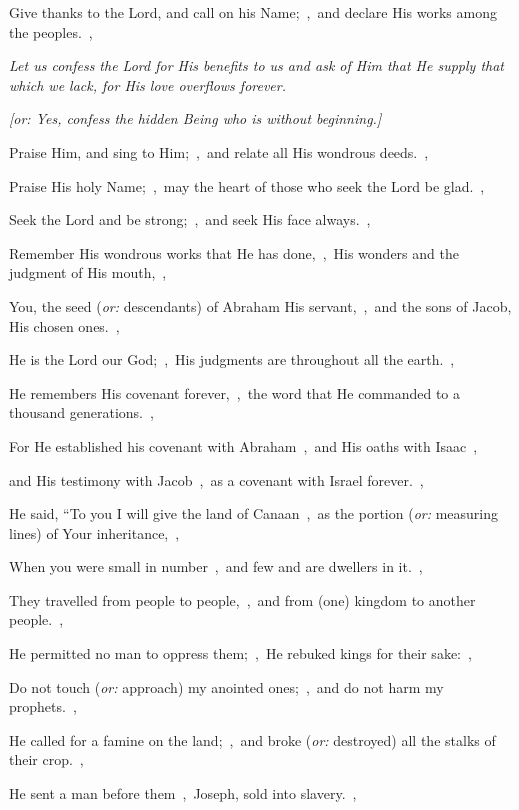 \documentclass[12pt,twoside,a5paper]{article}
\newcommand{\qanona}[1]{{\liturgicalhint{Qanona.} \emph{#1}}}
\newcommand{\translationoption}[1]{\emph{or:} #1}
\begin{document}
\begin{normalparskip}
  Give thanks to the Lord, and call on his Name;~\sep\ and declare His works among the peoples.~\sep

  \qanona{Let us confess the Lord for His benefits to us and ask of Him that He supply that which we lack, for His love overflows forever.}

  \emph{[or: Yes, confess the hidden Being who is without beginning.]}

  Praise Him, and sing to Him;~\sep\ and relate all His wondrous deeds.~\sep

  Praise His holy Name;~\sep\ may the heart of those who seek the Lord be glad.~\sep

  Seek the Lord and be strong;~\sep\ and seek His face always.~\sep

  Remember His wondrous works that He has done,~\sep\ His wonders and the judgment of His mouth,~\sep

  You, the seed (\translationoption{descendants}) of Abraham His servant,~\sep\ and the sons of Jacob, His chosen ones.~\sep

  He is the Lord our God;~\sep\ His judgments are throughout all the earth.~\sep

  He remembers His covenant forever,~\sep\ the word that He commanded to a thousand generations.~\sep

  For He established his covenant with Abraham~\sep\ and His oaths with Isaac~\sep

  and His testimony with Jacob~\sep\ as a covenant with Israel forever.~\sep

  He said, ``To you I will give the land of Canaan~\sep\ as the portion (\translationoption{measuring lines}) of Your inheritance,~\sep

  When you were small in number~\sep\ and few and are dwellers in it.~\sep

  They travelled from people to people,~\sep\ and from (one) kingdom to another people.~\sep

  He permitted no man to oppress them;~\sep\ He rebuked kings for their sake:~\sep

  Do not touch (\translationoption{approach}) my anointed ones;~\sep\ and do not harm my prophets.~\sep

  He called for a famine on the land;~\sep\ and broke (\translationoption{destroyed}) all the stalks of their crop.~\sep

  He sent a man before them~\sep\ Joseph, sold into slavery.~\sep


\end{normalparskip}
\end{document}
